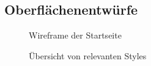 \subsection{Oberflächenentwürfe}
\label{app:Entwuerfe}

\begin{figure}[h]
\centering
{}
\caption{Wireframe der Startseite}
\end{figure}

\begin{figure}[h]
\centering
{}
\caption{Übersicht von relevanten Styles}
\end{figure}


